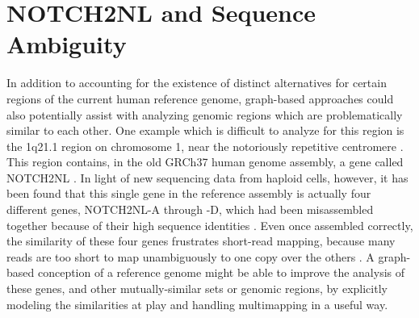 \documentclass[11pt,proposal]{ucthesis}
\begin{document}
    

\section{NOTCH2NL and Sequence Ambiguity}
    
In addition to accounting for the existence of distinct alternatives for certain regions of the current human reference genome, graph-based approaches could also potentially assist with analyzing genomic regions which are problematically similar to each other. One example which is difficult to analyze for this region is the 1q21.1 region on chromosome 1, near the notoriously repetitive centromere \cite{jacobs2014recently}. This region contains, in the old GRCh37 human genome assembly, a gene called NOTCH2NL \cite{jacobs2014recently}. In light of new sequencing data from haploid cells, however, it has been found that this single gene in the reference assembly is actually four different genes, NOTCH2NL-A through -D, which had been misassembled together because of their high sequence identities \cite{jacobs2014recently}. Even once assembled correctly, the similarity of these four genes frustrates short-read mapping, because many reads are too short to map unambiguously to one copy over the others \cite{jacobs2014recently}. A graph-based conception of a reference genome might be able to improve the analysis of these genes, and other mutually-similar sets or genomic regions, by explicitly modeling the similarities at play and handling multimapping in a useful way.
    
    
    
    
    
    
\end{document}
